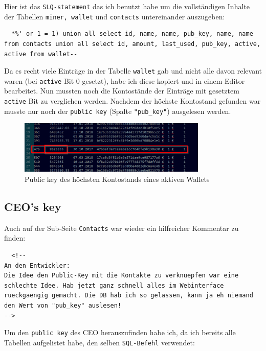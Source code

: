 \documentclass[12pt,a4paper,titlepage,oneside]{scrartcl}
\begin{document}
Hier ist das \lstinline{SLQ-statement} das ich benutzt habe um die vollständigen Inhalte der Tabellen \lstinline{miner, wallet} und \lstinline{contacts} untereinander auszugeben:

\begin{lstlisting}
  *%' or 1 = 1) union all select id, name, name, pub_key, name, name from contacts union all select id, amount, last_used, pub_key, active, active from wallet--
\end{lstlisting}

Da es recht viele Einträge in der Tabelle \lstinline{wallet} gab und nicht alle davon relevant waren (bei \lstinline{active} Bit 0 gesetzt), habe ich diese kopiert und in einem Editor bearbeitet. Nun mussten noch die Kontostände der Einträge mit gesetztem \lstinline{active} Bit zu verglichen werden. Nachdem der höchste Kontostand gefunden war musste nur noch der \lstinline{public key} (Spalte \lstinline{"pub_key"}) ausgelesen werden.

\begin{figure}[h!]
  \centering
  \includegraphics[width=0.8\textwidth]{./imgs/manager9000/wallet_pub_key.png}
\caption{Public key des höchsten Kontostands eines aktiven Wallets}
\label{fig:wallet_pub_key}
\end{figure}

\subsection{CEO's key}

Auch auf der Sub-Seite \lstinline{Contacts} war wieder ein hilfreicher Kommentar zu finden:

\begin{lstlisting}
  <!--
An den Entwickler:
Die Idee den Public-Key mit die Kontakte zu verknuepfen war eine schlechte Idee. Hab jetzt ganz schnell alles im Webinterface rueckgaengig gemacht. Die DB hab ich so gelassen, kann ja eh niemand den Wert von "pub_key" auslesen!
-->
\end{lstlisting}

Um den \lstinline{public key} des CEO herauszufinden habe ich, da ich bereits alle Tabellen aufgelistet habe, den selben \lstinline{SQL-Befehl} verwendet:
\end{document}
